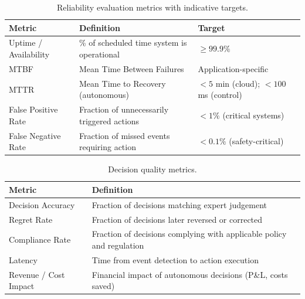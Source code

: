 \documentclass[12pt, a4paper]{article}
\begin{document}
\begin{table}[ht]
\centering
\caption{Reliability evaluation metrics with indicative targets.}
\label{tab:metrics-reliability}
\begin{tabular}{lll}
\toprule
\textbf{Metric} & \textbf{Definition} & \textbf{Target} \\
\midrule
Uptime / Availability        & \% of scheduled time system is operational & $\geq99.9\%$ \\
MTBF                         & Mean Time Between Failures                & Application-specific \\
MTTR                         & Mean Time to Recovery (autonomous)        & $<5$ min (cloud); $<100$ ms (control) \\
False Positive Rate          & Fraction of unnecessarily triggered actions & $<1\%$ (critical systems) \\
False Negative Rate          & Fraction of missed events requiring action  & $<0.1\%$ (safety-critical) \\
\bottomrule
\end{tabular}
\end{table}

\begin{table}[ht]
\centering
\caption{Decision quality metrics.}
\label{tab:metrics-quality}
\begin{tabular}{ll}
\toprule
\textbf{Metric} & \textbf{Definition} \\
\midrule
Decision Accuracy    & Fraction of decisions matching expert judgement \\
Regret Rate          & Fraction of decisions later reversed or corrected \\
Compliance Rate      & Fraction of decisions complying with applicable policy and regulation \\
Latency              & Time from event detection to action execution \\
Revenue / Cost Impact & Financial impact of autonomous decisions (P\&L, costs saved) \\
\bottomrule
\end{tabular}
\end{table}
\end{document}
